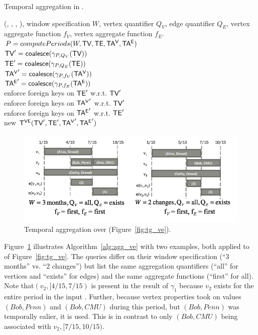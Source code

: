 \begin{algorithm}[h!]
\caption{Temporal aggregation in \tve.}
\begin{algorithmic}[1]
\REQUIRE \tve (\tv, \te, \tav, \tae), window specification $W$, vertex
quantifier $Q_V$, edge quantifier $Q_E$, vertex aggregate function
$f_V$, vertex aggregate function $f_E$.\\
\STATE $P = computePeriods(W, \textsf{TV}, \textsf{TE}, \mathsf{TA^{V}}, \mathsf{TA^{E}})$\\
\STATE  $\textsf{TV}' = \textsf{coalesce} (\gamma_{P,Q_V}(\textsf{TV}))$\\
\STATE  $\textsf{TE}' = \textsf{coalesce} (\gamma_{P,Q_E}(\textsf{TE}))$\\
\STATE  $\mathsf{TA^{V}}' = \textsf{coalesce} (\gamma_{P,f_V}(\mathsf{TA^{V}}))$\\
\STATE  $\mathsf{TA^{E}}' = \textsf{coalesce} (\gamma_{P,f_E}(\mathsf{TA^{E}}))$\\
\STATE  enforce foreign keys on $\textsf{TE}'$ w.r.t. $\textsf{TV}'$\\
\STATE  enforce foreign keys on $\mathsf{TA^{V}}'$ w.r.t. $\textsf{TV}'$\\
\STATE  enforce foreign keys on $\mathsf{TA^{E}}'$ w.r.t. $\textsf{TE}'$\\
\RETURN new $\mathsf{T^{VE}} (\textsf{TV}', \textsf{TE}', \mathsf{TA^{V}}', \mathsf{TA^{E}}')$\\
\end{algorithmic}
\label{alg:agg_ve}
\end{algorithm}

\begin{figure}
\includegraphics[width=5in]{figs/agg.png}
\caption{Temporal aggregation over  (Figure~\ref{fig:tg_ve}).}
\label{fig:tg_agg}
\end{figure}

Figure~\ref{fig:tg_agg} illustrates Algorithm~\ref{alg:agg_ve} with
two examples, both applied to  of Figure~\ref{fig:tg_ve}.
The queries differ on their window specification (``3 months'' vs. ``2
changes'') but list the same aggregation quantifiers (``all'' for
vertices and ``exists'' for edges) and the same aggregate functions
(``first'' for all).  Note that$(v_2, [4/15, 7/15)$ is present in the
  result of $\gamma_1$ because $v_2$ exists for the entire period in
  the input .  Further, because vertex properties took on
  values $(Bob, Penn)$ and $(Bob, CMU)$ during this period, but $(Bob,
  Penn)$ was temporally ealier, it is used.  This is in contrast to
  only $(Bob, CMU)$ being associated with $v_2, [7/15, 10/15)$.

